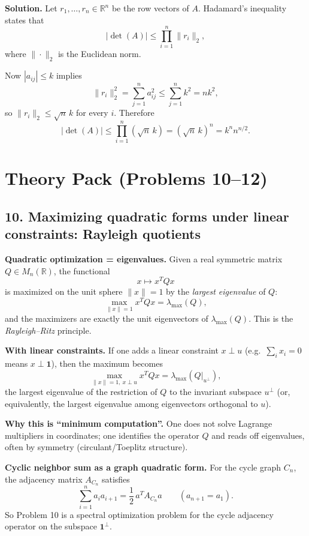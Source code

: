 \documentclass[12pt,a4paper]{article}
\theoremstyle{plain}
\theoremstyle{definition}      %
\begin{document}
\textbf{Solution.}
Let $r_1,\dots,r_n\in\mathbb R^n$ be the row vectors of $A$.
Hadamard's inequality states that
\[
|\det(A)|\le \prod_{i=1}^n \|r_i\|_2,
\]
where $\|\cdot\|_2$ is the Euclidean norm.

Now $|a_{ij}|\le k$ implies
\[
\|r_i\|_2^2=\sum_{j=1}^n a_{ij}^2 \le \sum_{j=1}^n k^2 = nk^2,
\]
so $\|r_i\|_2\le \sqrt n\,k$ for every $i$.
Therefore
\[
|\det(A)|
\le \prod_{i=1}^n (\sqrt n\,k)
=(\sqrt n\,k)^n
=k^n n^{n/2}.
\]



\section*{Theory Pack (Problems 10--12)}

\subsection*{10. Maximizing quadratic forms under linear constraints: Rayleigh quotients}

\textbf{Quadratic optimization = eigenvalues.}
Given a real symmetric matrix $Q\in M_n(\mathbb R)$, the functional
\[
x\mapsto x^TQx
\]
is maximized on the unit sphere $\|x\|=1$ by the \emph{largest eigenvalue} of $Q$:
\[
\max_{\|x\|=1} x^TQx = \lambda_{\max}(Q),
\]
and the maximizers are exactly the unit eigenvectors of $\lambda_{\max}(Q)$.
This is the \emph{Rayleigh--Ritz} principle.

\textbf{With linear constraints.}
If one adds a linear constraint $x\perp u$ (e.g.\ $\sum_i x_i=0$ means $x\perp \mathbf 1$), then the maximum becomes
\[
\max_{\|x\|=1,\ x\perp u} x^TQx = \lambda_{\max}\!\left(Q\big|_{u^\perp}\right),
\]
the largest eigenvalue of the restriction of $Q$ to the invariant subspace $u^\perp$ (or, equivalently, the largest eigenvalue among eigenvectors orthogonal to $u$).

\textbf{Why this is ``minimum computation''.}
One does not solve Lagrange multipliers in coordinates; one identifies the operator $Q$ and reads off eigenvalues, often by symmetry (circulant/Toeplitz structure).

\textbf{Cyclic neighbor sum as a graph quadratic form.}
For the cycle graph $C_n$, the adjacency matrix $A_{C_n}$ satisfies
\[
\sum_{i=1}^n a_i a_{i+1} = \frac12\, a^T A_{C_n} a \qquad (a_{n+1}=a_1).
\]
So Problem 10 is a spectral optimization problem for the cycle adjacency operator on the subspace $\mathbf 1^\perp$.
\end{document}
